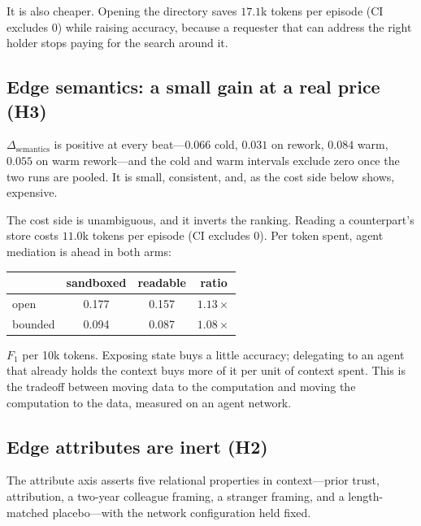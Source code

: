 It is also cheaper. Opening the directory saves $17.1$k tokens per episode
(CI excludes 0) while raising accuracy, because a requester that can address the
right holder stops paying for the search around it.

\subsection{Edge semantics: a small gain at a real price (H3)}

$\Delta_\text{semantics}$ is positive at every beat---$0.066$ cold,
$0.031$ on rework, $0.084$ warm, $0.055$ on warm rework---and the cold and warm intervals
exclude zero once the two runs are pooled. It is small, consistent, and, as the cost side
below shows, expensive.

The cost side is unambiguous, and it inverts the ranking. Reading a
counterpart's store costs $11.0$k tokens per episode (CI excludes 0). Per token
spent, agent mediation is ahead in both arms:

\begin{center}\small
\begin{tabular}{@{}lccc@{}}
\toprule
& sandboxed & readable & ratio \\
\midrule
open    & 0.177 & 0.157 & $1.13\times$ \\
bounded & 0.094 & 0.087 & $1.08\times$ \\
\bottomrule
\end{tabular}
\end{center}
\noindent
$F_1$ per 10k tokens. Exposing state buys a little accuracy; delegating to an
agent that already holds the context buys more of it per unit of context spent.
This is the tradeoff between moving data to the computation and moving the
computation to the data, measured on an agent network.

\subsection{Edge attributes are inert (H2)}

The attribute axis asserts five relational properties in context---prior trust,
attribution, a two-year colleague framing, a stranger framing, and a
length-matched placebo---with the network configuration held fixed.

